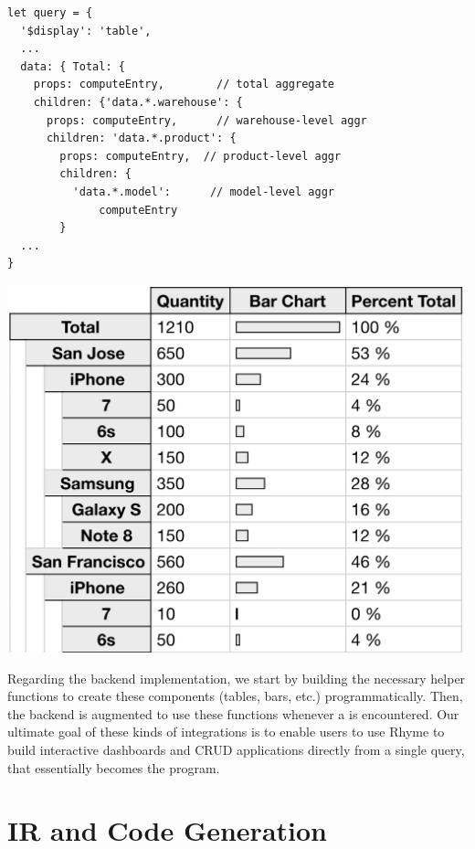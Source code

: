 \documentclass[runningheads]{llncs}
\newcommand{\lang}{Rhyme}
\begin{document}
\hspace{-18pt}
\begin{minipage}{0.6\textwidth}
\begin{lstlisting}[style=JavaScript,columns=flexible]
let query = {
  '$display': 'table',
  ...
  data: { Total: {                    
    props: computeEntry,        // total aggregate           
    children: {'data.*.warehouse': { 
      props: computeEntry,      // warehouse-level aggr
      children: 'data.*.product': {     
        props: computeEntry,  // product-level aggr
        children: {
          'data.*.model':      // model-level aggr
              computeEntry
        }
  ...
}
\end{lstlisting}
\end{minipage}%
\begin{minipage}{0.4\textwidth}
\centering
\includegraphics[width=\textwidth]{images/big_table.png}
\end{minipage}

Regarding the backend implementation, we start by building the necessary helper
functions to create these components (tables, bars, etc.) programmatically.
Then, the backend is augmented to use these functions whenever a 
is encountered.
Our ultimate goal of these kinds of integrations is to enable users
to use \lang{} to build interactive dashboards and CRUD applications 
directly from a single query, that essentially becomes the program.

\section{IR and Code Generation}~\label{sec:ir_codegen}
\end{document}
